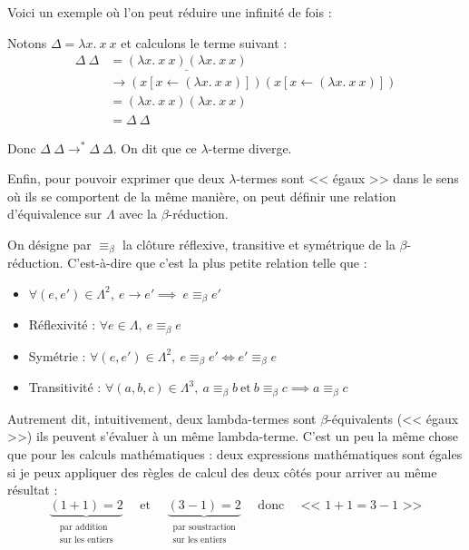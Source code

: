 \documentclass[11pt]{article}
\begin{document}
Voici un exemple où l'on peut réduire une infinité de fois :
\begin{example}
    Notons $\Delta = \lambda x.~x~x$ et calculons le terme suivant :
    \begin{equation*}
    \begin{aligned}
        \Delta~\Delta &= \underline{\left(\lambda x.~x~x\right) \left(\lambda x.~x~x\right)}\\
        &\longrightarrow \left(x\left[x\leftarrow \left(\lambda x.~x~x\right)\right]\right) \left(x\left[x\leftarrow \left(\lambda x.~x~x\right)\right]\right)\\
        &= \left(\lambda x.~x~x\right) \left(\lambda x.~x~x\right)\\
        &=\Delta~\Delta
    \end{aligned}
    \end{equation*}

    Donc $\Delta~\Delta \longrightarrow^* \Delta~\Delta$. On dit que ce $\lambda$-terme diverge.
\end{example}

Enfin, pour pouvoir exprimer que deux $\lambda$-termes sont << égaux >> dans le sens où ils se comportent de la même manière, on peut définir une relation d'équivalence sur $\Lambda$ avec la $\beta$-réduction.

\begin{definition}
    On désigne par $\equiv_\beta$ la clôture réflexive, transitive et symétrique de la $\beta$-réduction. C'est-à-dire que c'est la plus petite relation telle que :
    \begin{itemize}
        \item $\forall (e, e') \in\Lambda^2,~e\longrightarrow e' \implies~e\equiv_\beta e'$
        \item Réflexivité : $\forall e \in\Lambda,~e \equiv_\beta e$
        \item Symétrie : $\forall (e, e') \in\Lambda^2,~e\equiv_\beta e' \iff e' \equiv_\beta e$
        \item Transitivité : $\forall (a, b, c) \in\Lambda^3,~a\equiv_\beta b~\text{et}~b\equiv_\beta c \implies a \equiv_\beta c$
    \end{itemize}
\end{definition}

Autrement dit, intuitivement, deux lambda-termes sont $\beta$-équivalents (<< égaux >>) ils peuvent s'évaluer à un même lambda-terme. C'est un peu la même chose que pour les calculs mathématiques : deux expressions mathématiques sont égales si je peux appliquer des règles de calcul des deux côtés pour arriver au même résultat :
$$\underbrace{(1 + 1) = 2}_{\substack{\text{par addition}\\\text{sur les entiers}}}~~~~~~\text{et}~~~~~~\underbrace{(3-1)=2}_{\substack{\text{par soustraction}\\\text{sur les entiers}}}~~~~~~\text{donc}~~~~~~\text{<< }1+1=3-1\text{ >>}$$
\end{document}
